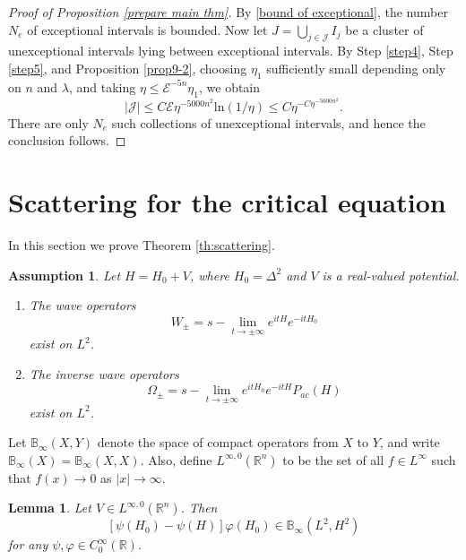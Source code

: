 \documentclass[11pt,a4paper]{article}
\numberwithin{equation}{section}
\newtheorem{lemma}[theorem]{Lemma}
\newtheorem{assumption}[theorem]{Assumption}
\begin{document}
\begin{proof}[Proof of Proposition \ref{prepare main thm}]
By \eqref{bound of exceptional}, the number $N_{e}$ of exceptional intervals is bounded.
Now let $J = \bigcup_{j \in \mathcal{J}}I_{j}$ be a cluster of unexceptional intervals lying between exceptional intervals.
By Step \ref{step4}, Step \ref{step5}, and Proposition \ref{prop9-2}, choosing $\eta_{1}$ sufficiently small depending only on $n$ and $\lambda$, and taking $\eta \leq \mathcal{E}^{-5n}\eta_{1}$, we obtain
\[
 |\mathcal{J}| \leq C\mathcal{E}\eta^{-5000n^{2}}\text{ln}(1/\eta) \leq C\eta^{-C\eta^{-5000n^{2}}}.
\]
There are only $N_{e}$ such collections of unexceptional intervals, and hence the conclusion follows.
\end{proof}

\section{Scattering for the critical equation}

In this section we prove Theorem \ref{th:scattering}.

\begin{assumption}\label{as: linear scattering}
Let $H = H_{0} + V$, where $H_{0} = \Delta^{2}$ and $V$ is a real-valued potential.
\begin{enumerate}
\item[(H1)]
The wave operators
\[
W_{\pm} = s-\lim_{t \rightarrow \pm \infty} e^{itH}e^{-itH_{0}}
\]
exist on $L^{2}$.
\item[(H2)]
The inverse wave operators
\[
\Omega_{\pm} = s-\lim_{t \rightarrow \pm \infty} e^{itH_{0}}e^{-itH}P_{ac}(H)
\]
exist on $L^{2}$.
\end{enumerate}
\end{assumption}

Let $\mathbb{B}_{\infty}(X, Y)$ denote the space of compact operators from $X$ to $Y$, and write $\mathbb{B}_{\infty}(X) = \mathbb{B}_{\infty}(X, X)$.
Also, define $L^{\infty, 0}(\mathbb{R}^{n})$ to be the set of all $f \in L^{\infty}$ such that $f(x)\to 0$ as $|x|\to\infty$.

\begin{lemma}\label{lemma:scattering}
Let $V \in L^{\infty, 0}(\mathbb{R}^{n})$. Then
\[
[\psi(H_{0}) - \psi(H)]\varphi(H_{0}) \in \mathbb{B}_{\infty}(L^{2}, H^{2})
\]
for any $\psi, \varphi \in C^{\infty}_{0}(\mathbb{R})$.
\end{lemma}
\end{document}
